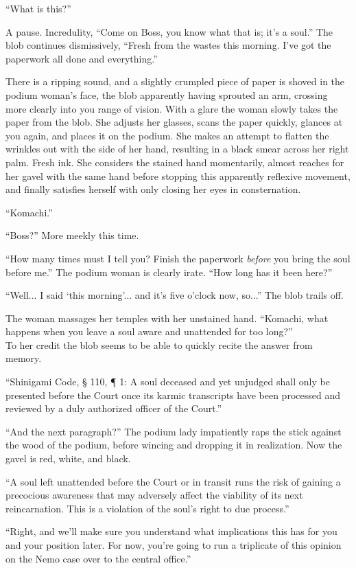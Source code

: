 \documentclass[a4paper,12pt]{book}
\begin{document}
``What is this?''

A pause. Incredulity, ``Come on Boss, you know what that is; it's a soul.'' The blob continues dismissively, ``Fresh from the wastes this morning. I've got the paperwork all done and everything.''

There is a ripping sound, and a slightly crumpled piece of paper is shoved in the podium woman's face, the blob apparently having sprouted an arm, crossing more clearly into you range of vision. With a glare the woman slowly takes the paper from the blob. She adjusts her glasses, scans the paper quickly, glances at you again, and places it on the podium. She makes an attempt to flatten the wrinkles out with the side of her hand, resulting in a black smear across her right palm. Fresh ink. She considers the stained hand momentarily, almost reaches for her gavel with the same hand before stopping this apparently reflexive movement, and finally satisfies herself with only closing her eyes in consternation.

``Komachi.''

``Boss?'' More meekly this time.

``How many times must I tell you? Finish the paperwork \emph{before} you bring the soul before me.'' The podium woman is clearly irate. ``How long has it been here?''

``Well... I said `this morning'... and it's five o'clock now, so...'' The blob trails off.

The woman massages her temples with her unstained hand. ``Komachi, what happens when you leave a soul aware and unattended for too long?''\\
To her credit the blob seems to be able to quickly recite the answer from memory.

``Shinigami Code, § 110, ¶ 1: A soul deceased and yet unjudged shall only be presented before the Court once its karmic transcripts have been processed and reviewed by a duly authorized officer of the Court.''

``And the next paragraph?'' The podium lady impatiently raps the stick against the wood of the podium, before wincing and dropping it in realization. Now the gavel is red, white, and black.

``A soul left unattended before the Court or in transit runs the risk of gaining a precocious awareness that may adversely affect the viability of its next reincarnation. This is a violation of the soul's right to due process.''

``Right, and we'll make sure you understand what implications this has for you and your position later. For now, you're going to run a triplicate of this opinion on the Nemo case over to the central office.''
\end{document}
